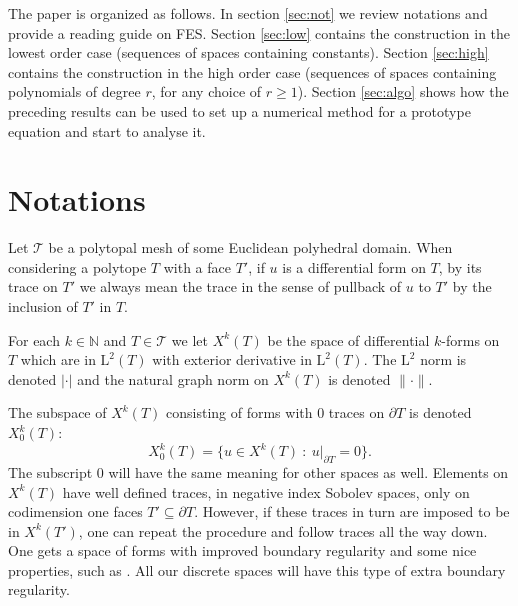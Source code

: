 \documentclass[10pt,a4paper]{article}
\newcommand{\rmL}{\mathrm{L}}
\newcommand{\bbN}{\mathbb{N}}
\newcommand{\calT}{\mathcal{T}}
\theoremstyle{remark}
\theoremstyle{definition}
\numberwithin{equation}{section}
\begin{document}
The paper is organized as follows. In section \ref{sec:not} we review notations and provide a reading guide on FES. Section \ref{sec:low} contains the construction in the lowest order case (sequences of spaces containing constants). Section \ref{sec:high} contains the construction in the high order case (sequences of spaces containing polynomials of degree $r$, for any choice of $r \geq 1$). Section \ref{sec:algo} shows how the preceding results can be used to set up a numerical method for a prototype equation and start to analyse it.

\section{Notations\label{sec:not}}
 Let $\calT$ be a polytopal mesh of some Euclidean polyhedral domain. When considering a polytope $T$ with a face $T'$, if $u$ is a differential form on $T$, by its trace on $T'$ we always mean the trace in the sense of pullback of $u$ to $T'$ by the inclusion of $T'$ in $T$.

For each $k \in \bbN$ and $T\in \calT$ we let $X^k(T)$ be the space of differential $k$-forms on $T$ which are in $\rmL^2(T)$ with exterior derivative in $\rmL^2(T)$. The $\rmL^2$ norm is denoted $|\cdot|$ and the natural graph norm on $X^k(T)$ is denoted $\| \cdot \|$.


The subspace of $X^k(T)$ consisting of forms with $0$ traces on $\partial T$ is denoted $X^k_0(T)$:
\begin{equation}
  X^k_0(T) = \{ u \in X^k(T) \ : \ u|_{\partial T} = 0\}.
\end{equation}
The subscript $0$ will have the same meaning for other spaces as well. Elements on $X^k(T)$ have well defined traces, in negative index Sobolev spaces, only on codimension one faces $T' \subseteq \partial T$. However, if these traces in turn are imposed to be in $X^k(T')$, one can repeat the procedure and follow traces all the way down. One gets a space of forms with improved boundary regularity and some nice properties, such as \cite[Proposition 2.4]{ChrRap16}. All our discrete spaces will have this type of extra boundary regularity.

\end{document}
